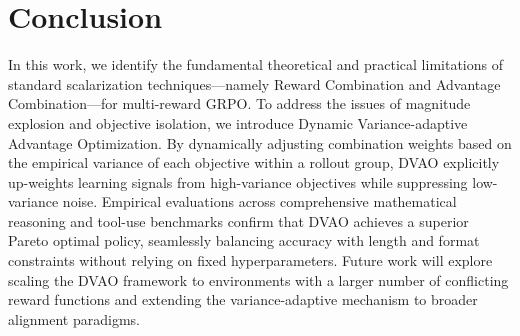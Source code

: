 \section{Conclusion}

In this work, we identify the fundamental theoretical and practical limitations of standard scalarization techniques—namely Reward Combination and Advantage Combination—for multi-reward GRPO. To address the issues of magnitude explosion and objective isolation, we introduce Dynamic Variance-adaptive Advantage Optimization. By dynamically adjusting combination weights based on the empirical variance of each objective within a rollout group, DVAO explicitly up-weights learning signals from high-variance objectives while suppressing low-variance noise. Empirical evaluations across comprehensive mathematical reasoning and tool-use benchmarks confirm that DVAO achieves a superior Pareto optimal policy, seamlessly balancing accuracy with length and format constraints without relying on fixed hyperparameters. Future work will explore scaling the DVAO framework to environments with a larger number of conflicting reward functions and extending the variance-adaptive mechanism to broader alignment paradigms.